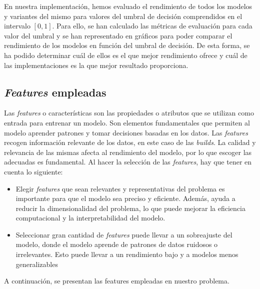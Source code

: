 En nuestra implementación, hemos evaluado el rendimiento de todos los modelos y variantes del
mismo para valores del umbral de decisión comprendidos en el intervalo $[0, 1]$. Para ello, se
han calculado las métricas de evaluación para cada valor del umbral y se han representado en
gráficos para poder comparar el rendimiento de los modelos en función del umbral de decisión. De
esta forma, se ha podido determinar cuál de ellos es el que mejor rendimiento ofrece y cuál de
las implementaciones es la que mejor resultado proporciona.


\subsection{\textit{Features} empleadas}
Las \textit{features} o características son las propiedades o atributos que se utilizan como entrada
para entrenar un modelo. Son elementos fundamentales que permiten al modelo aprender patrones y
tomar decisiones basadas en los datos. Las \textit{features} recogen información relevante de
los datos, en este caso de las \textit{builds}. La calidad y relevancia de las mismas afecta
al rendimiento del modelo, por lo que escoger las adecuadas es fundamental. Al hacer la selección
de las \textit{features}, hay que tener en cuenta lo siguiente:

\begin{itemize}
    \item Elegir \textit{features} que sean relevantes y representativas del problema es importante
    para que el modelo sea preciso y eficiente. Además, ayuda a reducir la dimensionalidad
    del problema, lo que puede mejorar la eficiencia computacional y la interpretabilidad del
    modelo.\\
    \item Seleccionar gran cantidad de \textit{features} puede llevar a un sobreajuste del modelo,
    donde el modelo aprende de patrones de datos ruidosos o irrelevantes. Esto puede llevar a un
    rendimiento bajo y a modelos menos generalizables
\end{itemize}

\noindent A continuación, se presentan las features empleadas en nuestro problema.

